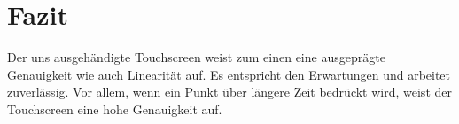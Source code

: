 \chapter{Fazit}

Der uns ausgehändigte Touchscreen weist zum einen eine ausgeprägte Genauigkeit wie auch Linearität auf. Es entspricht den Erwartungen und arbeitet zuverlässig.
Vor allem, wenn ein Punkt über längere Zeit bedrückt wird, weist der Touchscreen eine hohe Genauigkeit auf. 

